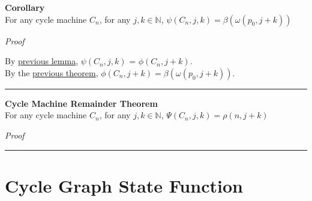 \documentclass[a4paper,12pt]{article}
\begin{document}
\label{corollary:bridged_state_function}
\hypertarget{corollary:bridged_state_function}{}
\begin{tcolorbox}
\textbf{Corollary}\\
For any cycle machine $C_n$, for any $j, k \in \mathbb{N}$, $\psi(C_n, j, k) = \beta(\omega(p_0, j + k))$
\end{tcolorbox}

\noindent
\textit{Proof}

\noindent By \hyperlink{lemma:psi_well_defined}{previous lemma}, $\psi(C_n, j, k)$ = $\phi(C_n, j + k)$.\\

\noindent By the \hyperlink{theorem:bridge_theorem}{previous theorem}, $\phi(C_n, j + k) = \beta(\omega(p_0, j + k))$.

\begin{center}
\noindent\rule{8cm}{0.4pt}
\end{center}






\label{theorem:cycle_machine_remainder_theorem}
\hypertarget{theorem:cycle_machine_remainder_theorem}{}
\begin{tcolorbox}
\textbf{Cycle Machine Remainder Theorem}\\
For any cycle machine $C_n$, for any $j, k \in \mathbb{N}$, $\Psi(C_n, j, k) = \rho(n, j + k)$
\end{tcolorbox}

\noindent
\textit{Proof}

\noindent
 
\begin{center}
\noindent\rule{8cm}{0.4pt}
\end{center}





\section{Cycle Graph State Function}
\end{document}
